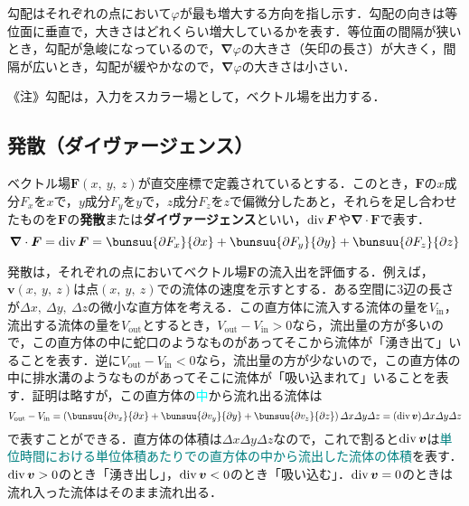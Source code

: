 勾配はそれぞれの点において$\varphi$が最も増大する方向を指し示す．勾配の向きは等位面に垂直で，大きさはどれくらい増大しているかを表す．等位面の間隔が狭いとき，勾配が急峻になっているので，$\bm{\nabla} \varphi$の大きさ（矢印の長さ）が大きく，間隔が広いとき，勾配が緩やかなので，$\bm{\nabla} \varphi$の大きさは小さい．

《注》勾配は，入力をスカラー場として，ベクトル場を出力する．



\subsection{発散（ダイヴァージェンス）}

ベクトル場$\bm{F}(x,\ y,\ z)$が直交座標で定義されているとする．このとき，$\bm{F}$の$x$成分$F_x$を$x$で，$y$成分$F_y$を$y$で，$z$成分$F_z$を$z$で偏微分したあと，それらを足し合わせたものを$\bm{F}$の\textbf{発散}または\textbf{ダイヴァージェンス}といい，$\operatorname{div} \bm{F}$や$\bm{\nabla} \cdot \bm{F}$で表す．
\begin{equation}
	\bm{\nabla} \cdot \bm{F} = \dive \bm{F} = \bunsuu{\partial F_x}{\partial x} + \bunsuu{\partial F_y}{\partial y} + \bunsuu{\partial F_z}{\partial z}
\end{equation}

発散は，それぞれの点においてベクトル場$\bm{F}$の流入出を評価する．例えば，$\bm{v}(x,\ y,\ z)$は点$(x,\ y,\ z)$での流体の速度を示すとする．ある空間に3辺の長さが$\varDelta x,\ \varDelta y,\ \varDelta z$の微小な直方体を考える．この直方体に流入する流体の量を$V_{\mathrm{in}}$，流出する流体の量を$V_{\mathrm{out}}$とするとき，$V_{\mathrm{out}} - V_{\mathrm{in}} > 0$なら，流出量の方が多いので，この直方体の中に蛇口のようなものがあってそこから流体が「湧き出て」いることを表す．逆に$V_{\mathrm{out}} - V_{\mathrm{in}} < 0$なら，流出量の方が少ないので，この直方体の中に排水溝のようなものがあってそこに流体が「吸い込まれて」いることを表す．証明は略すが，この直方体の\textcolor{cyan}{中}から流れ出る流体は
\begin{equation*}
	V_{\mathrm{out}} - V_{\mathrm{in}} = 
	\left(
		\bunsuu{\partial v_x}{\partial x} + \bunsuu{\partial v_y}{\partial y} + \bunsuu{\partial v_z}{\partial z}
	\right)
	\varDelta x \varDelta y \varDelta z
	= (\dive \bm{v}) \varDelta x \varDelta y \varDelta z
\end{equation*}
で表すことができる．直方体の体積は$\varDelta x \varDelta y \varDelta z$なので，これで割ると$\operatorname{div} \bm{v}$は\textcolor{teal}{単位時間における単位体積あたりでの直方体の中から流出した流体の体積}を表す．$\operatorname{div}\bm{v} > 0$のとき「湧き出し」，$\operatorname{div}\bm{v} < 0$のとき「吸い込む」．$\operatorname{div}\bm{v} = 0$のときは流れ入った流体はそのまま流れ出る．

